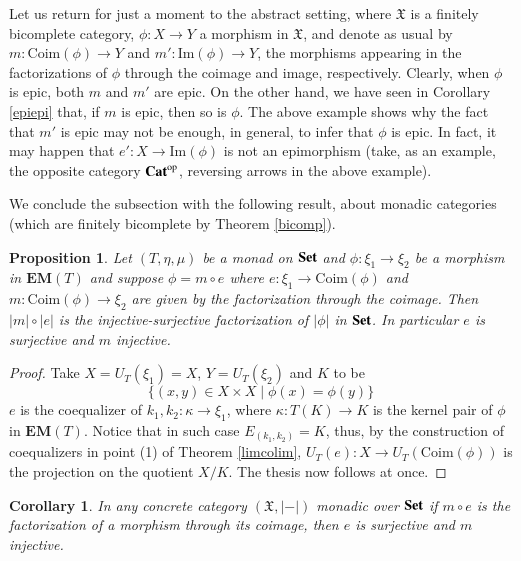 \documentclass[12pt]{article}
\newtheorem{proposition}[lemma]{Proposition}
\newtheorem{corollary}[lemma]{Corollary}
\theoremstyle{definition}
\def\X{\mathfrak X}
\def\Coim{\mathrm{Coim}}
\def\Im{\mathrm{Im}}
\newcommand{\Set}{\textbf{\textup{Set}}}
\newcommand{\Cat}{\textbf{\textup{Cat}}}
\newcommand{\eim}[1]{\mathbf{EM}{(#1)}}
\numberwithin{equation}{section}
\begin{document}
Let us return for just a moment to the abstract setting, where $\X$ is a finitely bicomplete category, $\phi\colon X\to Y$ a morphism in $\X$, and denote as usual by $m\colon \Coim(\phi)\to Y$ and $m'\colon \Im(\phi)\to Y$, the morphisms appearing in the factorizations of $\phi$ through the coimage and image, respectively. Clearly, when $\phi$ is epic, both $m$ and $m'$ are epic. On the other hand, we have seen in Corollary \ref{epiepi} that, if $m$ is epic, then so is $\phi$. The above example shows why the fact that $m'$ is epic may not be enough, in general, to infer that $\phi$ is epic. In fact, it may happen that $e'\colon X\to \Im(\phi)$ is not an epimorphism (take, as an example, the opposite category $\Cat^{\mathrm{op}}$, reversing arrows in the above example).
\medskip 

We conclude the subsection with the following result, about monadic categories (which are finitely bicomplete by Theorem \ref{bicomp}).
\begin{proposition}\label{algebraic_factorization_prop}
	Let $(T, \eta, \mu)$ be a monad on $\Set$ and $\phi:\xi_1\rightarrow \xi_2$ be a morphism in $\eim{T}$ and suppose $\phi=m\circ e$  where $e:\xi_1\rightarrow \Coim(\phi)$ and $m:\Coim(\phi)\rightarrow \xi_2$ are given by the factorization through the coimage. Then $|m|\circ |e|$ is the injective-surjective factorization of $|\phi|$ in $\Set$. In particular $e$ is surjective and $m$ injective.    
\end{proposition}
\begin{proof}
	Take $X=U_T(\xi_1)=X$, $Y=U_T(\xi_2)$ and $K$ to be
	\[\{(x,y)\in X\times X\mid \phi(x)=\phi(y) \}\]
		$e$ is the coequalizer of $k_1, k_2:\kappa\rightarrow \xi_1$, where $\kappa:T(K)\rightarrow K$ is the kernel pair of $\phi$ in $\eim{T}$. Notice 
	 that in such case $E_{(k_1,k_2)}=K$, thus, by the construction of coequalizers in point (1) of Theorem \ref{limcolim}, $U_T(e):X\rightarrow U_T(\Coim(\phi))$ is the projection on the quotient $X/K$. The thesis now follows at once.
\end{proof}

\begin{corollary}
In any concrete category $(\X, |-|)$ monadic over $\Set$ if $m\circ e$ is the factorization of a morphism through its coimage, then $e$ is surjective and $m$ injective.
\end{corollary}
\end{document}
